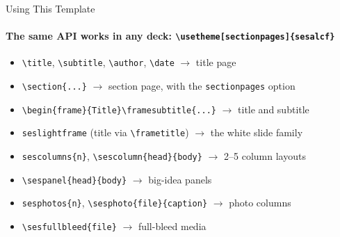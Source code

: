 \begin{frame}{Using This Template}
  \framesubtitle{The same API works in any deck: \texttt{\textbackslash usetheme[sectionpages]\{sesalcf\}}}
  \begin{itemize}
    \item \texttt{\textbackslash title}, \texttt{\textbackslash subtitle}, \texttt{\textbackslash author}, \texttt{\textbackslash date} \(\rightarrow\) title page
    \item \texttt{\textbackslash section\{...\}} \(\rightarrow\) section page, with the \texttt{sectionpages} option
    \item \texttt{\textbackslash begin\{frame\}\{Title\}\textbackslash framesubtitle\{...\}} \(\rightarrow\) title and subtitle
    \item \texttt{seslightframe} (title via \texttt{\textbackslash frametitle}) \(\rightarrow\) the white slide family
    \item \texttt{sescolumns\{n\}}, \texttt{\textbackslash sescolumn\{head\}\{body\}} \(\rightarrow\) 2--5 column layouts
    \item \texttt{\textbackslash sespanel\{head\}\{body\}} \(\rightarrow\) big-idea panels
    \item \texttt{sesphotos\{n\}}, \texttt{\textbackslash sesphoto\{file\}\{caption\}} \(\rightarrow\) photo columns
    \item \texttt{\textbackslash sesfullbleed\{file\}} \(\rightarrow\) full-bleed media
  \end{itemize}
\end{frame}


